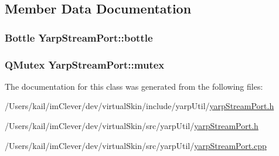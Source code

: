 \subsection{Member Data Documentation}
\hypertarget{class_yarp_stream_port_a02845704378d6350813b496589403cd7}{
\subsubsection[{bottle}]{\setlength{\rightskip}{0pt plus 5cm}Bottle {\bf YarpStreamPort::bottle}}}
\label{class_yarp_stream_port_a02845704378d6350813b496589403cd7}
\hypertarget{class_yarp_stream_port_afe137a99b998f77163794f17f87c1af6}{
\subsubsection[{mutex}]{\setlength{\rightskip}{0pt plus 5cm}QMutex {\bf YarpStreamPort::mutex}}}
\label{class_yarp_stream_port_afe137a99b998f77163794f17f87c1af6}


The documentation for this class was generated from the following files:\begin{DoxyCompactItemize}
\item 
/Users/kail/imClever/dev/virtualSkin/include/yarpUtil/\hyperlink{include_2yarp_util_2yarp_stream_port_8h}{yarpStreamPort.h}\item 
/Users/kail/imClever/dev/virtualSkin/src/yarpUtil/\hyperlink{src_2yarp_util_2yarp_stream_port_8h}{yarpStreamPort.h}\item 
/Users/kail/imClever/dev/virtualSkin/src/yarpUtil/\hyperlink{yarp_stream_port_8cpp}{yarpStreamPort.cpp}\end{DoxyCompactItemize}
